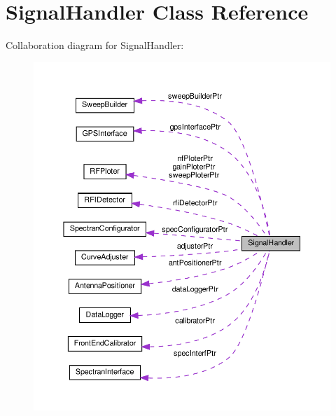 \hypertarget{classSignalHandler}{}\section{Signal\+Handler Class Reference}
\label{classSignalHandler}


Collaboration diagram for Signal\+Handler\+:\nopagebreak
\begin{figure}[H]
\begin{center}
\leavevmode
\includegraphics[width=350pt]{classSignalHandler__coll__graph}
\end{center}
\end{figure}
